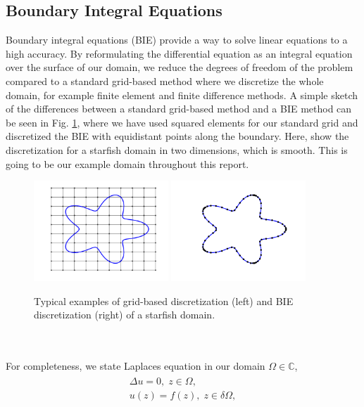 \documentclass[a4paper,10pt]{article}
\begin{document}
\subsection*{Boundary Integral Equations}
Boundary integral equations (BIE) provide a way to solve linear equations to a high accuracy. By reformulating the differential equation as an integral equation over the surface of our domain, we reduce the degrees of freedom of the problem compared to a standard grid-based method where we discretize the whole domain, for example finite element and finite difference methods. A simple sketch of the differences between a standard grid-based method and a BIE method can be seen in Fig. \ref{fig:disc}, where we have used squared elements for our standard grid and discretized the BIE with equidistant points along the boundary. Here, show the discretization for a starfish domain in two dimensions, which is smooth. This is going to be our example domain throughout this report. 
\begin{figure}[ht]
	\begin{center}
		\includegraphics[width=0.45\textwidth]{Graphics/starfish_grid.png}
		\includegraphics[width =0.45\textwidth]{Graphics/starfish_BIE.png}
	\end{center}
	\caption{Typical examples of grid-based discretization (left) and BIE discretization (right) of a starfish domain.}
	\label{fig:disc}
\end{figure}
\\ \\
For completeness, we state Laplaces equation in our domain $\Omega\in\mathbb{C}$, 
\begin{align}
	\begin{split}
		\Delta u = 0, \; z\in\Omega, \\
		u(z) = f(z), \; z\in\delta\Omega,  
	\end{split}
	\label{eq:laplace}
\end{align}
\end{document}
